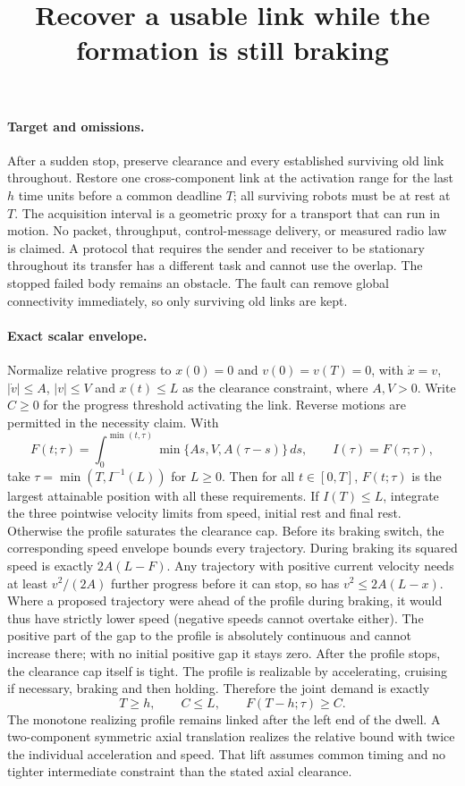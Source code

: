 \documentclass[11pt]{article}
\title{Recover a usable link while the formation is still braking}
\begin{document}
\maketitle
\paragraph{Target and omissions.}
After a sudden stop, preserve clearance and every established
surviving old link throughout. Restore one cross-component link at
the activation range for the last \(h\) time units before a common
deadline \(T\); all surviving robots must be at rest at \(T\).
The acquisition interval is a geometric proxy for a transport
that can run in motion. No packet, throughput, control-message
delivery, or measured radio law is claimed. A protocol that
requires the sender and receiver to be stationary throughout its
transfer has a different task and cannot use the overlap. The
stopped failed body remains an obstacle. The fault can remove global
connectivity immediately, so only surviving old links are kept.

\paragraph{Exact scalar envelope.}
Normalize relative progress to \(x(0)=0\) and \(v(0)=v(T)=0\),
with \(\dot x=v\), \(|\dot v|\le A\), \(|v|\le V\) and
\(x(t)\le L\) as the clearance constraint, where \(A,V>0\).
Write \(C\ge0\) for the progress threshold activating the link.
Reverse motions are permitted in the necessity claim. With
\[
 F(t;\tau)=\int_0^{\min(t,\tau)}
  \min\{As,V,A(\tau-s)\}\,ds,\qquad I(\tau)=F(\tau;\tau),
\]
take \(\tau=\min(T,I^{-1}(L))\) for \(L\ge0\). Then for all
\(t\in[0,T]\), \(F(t;\tau)\) is the largest attainable position
with all these requirements. If \(I(T)\le L\), integrate the three
pointwise velocity limits from speed, initial rest and final rest.
Otherwise the profile saturates the clearance cap. Before its
braking switch, the corresponding speed envelope bounds every
trajectory. During braking its squared speed is exactly
\(2A(L-F)\). Any trajectory with positive current velocity needs at
least \(v^2/(2A)\) further progress before it can stop, so has
\(v^2\le 2A(L-x)\). Where a proposed trajectory were ahead of
the profile during braking, it would thus have strictly lower
speed (negative speeds cannot overtake either). The positive
part of the gap to the profile is absolutely continuous and
cannot increase there; with no initial positive gap it stays
zero. After the profile stops, the clearance cap itself is tight.
The profile is realizable by accelerating, cruising if necessary,
braking and then holding. Therefore the joint demand is exactly
\[
 T\ge h,\qquad C\le L,\qquad F(T-h;\tau)\ge C .
\]
The monotone realizing profile remains linked after the left end
of the dwell. A two-component symmetric axial translation
realizes the relative bound with twice the individual acceleration
and speed. That lift assumes common timing and no tighter
intermediate constraint than the stated axial clearance.
\end{document}
